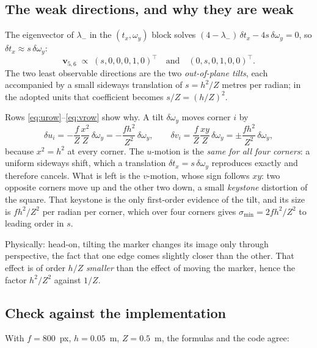 \documentclass[11pt,a4paper]{article}
\theoremstyle{remark}
\newcommand{\vvec}{\mathbf{v}}
\begin{document}
\subsection{The weak directions, and why they are weak}

The eigenvector of $\lambda_-$ in the $(t_x,\omega_y)$ block solves
$(4-\lambda_-)\,\delta t_x - 4s\,\delta\omega_y = 0$, so
$\delta t_x \approx s\,\delta\omega_y$:
\begin{equation}
  \vvec_{5,6} \;\propto\; (s,0,0,0,1,0)^{\top}
  \quad\text{and}\quad
  (0,s,0,1,0,0)^{\top}.
  \label{eq:weakdirs}
\end{equation}
The two least observable directions are the two \emph{out-of-plane tilts},
each accompanied by a small sideways translation of $s = h^2/Z$ metres per
radian; in the adopted units that coefficient becomes $s/Z = (h/Z)^2$.

Rows \eqref{eq:urow}--\eqref{eq:vrow} show why. A tilt $\delta\omega_y$ moves
corner $i$ by
\begin{equation}
  \delta u_i = -\frac{f}{Z}\frac{x^2}{Z}\,\delta\omega_y
             = -\frac{f h^2}{Z^2}\,\delta\omega_y ,
  \qquad
  \delta v_i = \frac{f}{Z}\frac{xy}{Z}\,\delta\omega_y
             = \pm\frac{f h^2}{Z^2}\,\delta\omega_y ,
\end{equation}
because $x^2 = h^2$ at every corner. The $u$-motion is the \emph{same for all
four corners}: a uniform sideways shift, which a translation
$\delta t_x = s\,\delta\omega_y$ reproduces exactly and therefore cancels. What
is left is the $v$-motion, whose sign follows $xy$: two opposite corners move
up and the other two down, a small \emph{keystone} distortion of the square.
That keystone is the only first-order evidence of the tilt, and its size is
$f h^2/Z^2$ per radian per corner, which over four corners gives
$\sigma_{\min} = 2fh^2/Z^2$ to leading order in $s$.

Physically: head-on, tilting the marker changes its image only through
perspective, the fact that one edge comes slightly closer than the other. That
effect is of order $h/Z$ \emph{smaller} than the effect of moving the marker,
hence the factor $h^2/Z^2$ against $1/Z$.

\subsection{Check against the implementation}

With $f = 800$~px, $h = 0.05$~m, $Z = 0.5$~m, the formulas and the code agree:
\end{document}
